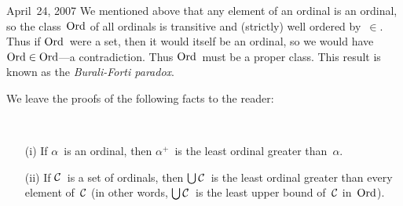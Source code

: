 \begin{lecture}{April~24, 2007}
We mentioned above that any element of an ordinal is an ordinal, so the class~\(\mathrm{Ord}\) of all ordinals is transitive and (strictly) well ordered by~\(\in\). Thus if \(\mathrm{Ord}\)~were a set, then it would itself be an ordinal, so we would have \(\mathrm{Ord}\in\mathrm{Ord}\)---a contradiction. Thus \(\mathrm{Ord}\)~must be a proper class. This result is known as the \emph{Burali-Forti paradox}.

We leave the proofs of the following facts to the reader:
\begin{prop}\
\begin{enumerate}[itemsep=0pt]
\item[(i)] If \(\alpha\)~is an ordinal, then \(\alpha^+\)~is the least ordinal greater than~\(\alpha\).
\item[(ii)] If \(\mathcal{C}\)~is a set of ordinals, then \(\bigcup\mathcal{C}\)~is the least ordinal greater than every element of~\(\mathcal{C}\) (in other words, \(\bigcup\mathcal{C}\)~is the least upper bound of~\(\mathcal{C}\) in~\(\mathrm{Ord}\)).
\end{enumerate}
\end{prop}
\end{lecture}

